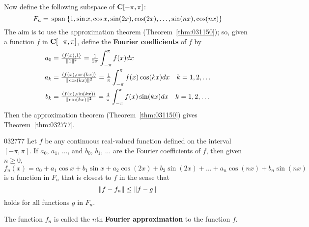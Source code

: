 Now define the following subspace of $\textbf{C}[-\pi, \pi]$:
\begin{equation*}
F_n = \thinspace\operatorname{span\medspace}\{1, \sin x, \cos x, \sin(2x), \cos(2x), \dots, \sin(nx), \cos(nx) \}
\end{equation*}
The aim is to use the approximation theorem (Theorem~\ref{thm:031150}); so, given a function $f$ in $\textbf{C}[-\pi, \pi]$, define the \textbf{Fourier coefficients} of $f$ by
\begin{align*}
a_0 &= \tfrac{\langle f(x), 1 \rangle}{\| 1 \| ^2} = \tfrac{1}{2\pi} \int_{-\pi}^{\pi} f(x)dx \\
a_k &= \tfrac{\langle f(x), \cos(kx) \rangle}{\| \cos(kx) \| ^2} =
\tfrac{1}{\pi} \int_{-\pi}^{\pi} f(x)\cos(kx)dx\quad k = 1, 2, \dots \\
b_k &= \tfrac{\langle f(x), \sin(kx) \rangle}{\| \sin(kx) \| ^2} =
\tfrac{1}{\pi} \int_{-\pi}^{\pi} f(x)\sin(kx)dx\quad k = 1, 2, \dots
\end{align*}
Then the approximation theorem (Theorem~\ref{thm:031150}) gives Theorem~\ref{thm:032777}.

\begin{theorem}{}{032777}
Let $f$ be any continuous real-valued function defined on the interval
$[-\pi, \pi]$. If $a_{0}$, $a_{1}$, $\dots$, and $b_{0}$, $b_{1}$, $\dots$ are the Fourier coefficients of $f$, then given $n \geq 0$,
\begin{equation*}
f_n(x) = a_0 + a_1 \cos x + b_1 \sin x + a_2 \cos(2x) + b_2 \sin(2x) + \dots + a_n \cos(nx) + b_n \sin(nx)
\end{equation*}
is a function in $F_{n}$ that is closest to $f$ in the sense that
\begin{equation*}
\| f - f_n \| \leq \| f - g \|
\end{equation*}
holds for all functions $g$ in $F_{n}$.
\end{theorem}

\noindent The function $f_{n}$ is called the $n$th \textbf{Fourier approximation} to the function $f$.

